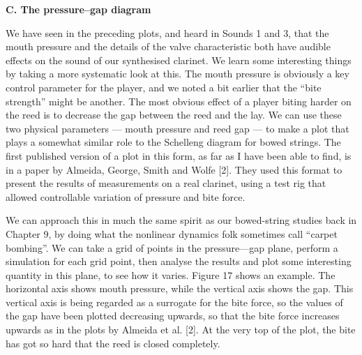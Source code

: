 


  \textbf{C. The pressure--gap diagram} 

  We have seen in the preceding plots, and heard in Sounds 1 and 3, that the 
  mouth pressure and the details of the valve characteristic both have audible 
  effects on the sound of our synthesised clarinet. We learn some interesting 
  things by taking a more systematic look at this. The mouth pressure is 
  obviously a key control parameter for the player, and we noted a bit earlier 
  that the “bite strength” might be another. The most obvious effect of a 
  player biting harder on the reed is to decrease the gap between the reed and 
  the lay. We can use these two physical parameters — mouth pressure and reed 
  gap — to make a plot that plays a somewhat similar role to the Schelleng 
  diagram for bowed strings. The first published version of a plot in this 
  form, as far as I have been able to find, is in a paper by Almeida, George, 
  Smith and Wolfe [2]. They used this format to present the results of 
  measurements on a real clarinet, using a test rig that allowed controllable 
  variation of pressure and bite force. 

  We can approach this in much the same spirit as our bowed-string studies back 
  in Chapter 9, by doing what the nonlinear dynamics folk sometimes call 
  “carpet bombing”. We can take a grid of points in the pressure—gap plane, 
  perform a simulation for each grid point, then analyse the results and plot 
  some interesting quantity in this plane, to see how it varies. Figure 17 
  shows an example. The horizontal axis shows mouth pressure, while the 
  vertical axis shows the gap. This vertical axis is being regarded as a 
  surrogate for the bite force, so the values of the gap have been plotted 
  decreasing upwards, so that the bite force increases upwards as in the plots 
  by Almeida et al. [2]. At the very top of the plot, the bite has got so hard 
  that the reed is closed completely. 

